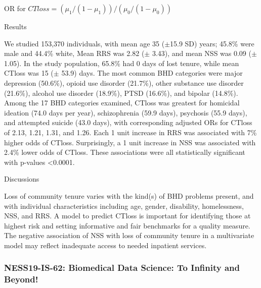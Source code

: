 \begin{itemize}
OR for $CTloss=(\mu_1/(1-\mu_1 ))/(\mu_0/(1-\mu_0 ))$

Results

We studied 153,370 individuals, with mean age 35 ($\pm$15.9 SD) years; 45.8\% were male and 44.4\% white, Mean RRS was 2.82 ($\pm$ 3.43), and mean NSS was 0.09 ($\pm$ 1.05). In the study population, 65.8\% had 0 days of lost tenure, while mean CTloss was 15 ($\pm$ 53.9) days. The most common BHD categories were major depression (50.6\%), opioid use disorder (21.7\%), other substance use disorder (21.6\%), alcohol use disorder (18.9\%), PTSD (16.6\%), and bipolar (14.8\%). Among the 17 BHD categories examined, CTloss was greatest for homicidal ideation (74.0 days per year), schizophrenia (59.9 days), psychosis (55.9 days), and attempted suicide (43.0 days), with corresponding adjusted ORs for CTloss of 2.13, 1.21, 1.31, and 1.26. Each 1 unit increase in RRS was associated with 7\% higher odds of CTloss. Surprisingly, a 1 unit increase in NSS was associated with 2.4\% lower odds of CTloss. These associations were all statistically significant with p-values <0.0001.

Discussions

Loss of community tenure varies with the kind(s) of BHD problems present, and with individual characteristics including age, gender, disability, homelessness, NSS, and RRS. A model to predict CTloss is important for identifying those at highest risk and setting informative and fair benchmarks for a quality measure. The negative association of NSS with loss of community tenure in a multivariate model may reflect inadequate access to needed inpatient services.  


\end{itemize}

\subsubsection*{NESS19-IS-62: Biomedical Data Science: To Infinity and Beyond!}


